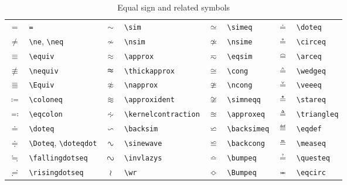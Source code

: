 \documentclass[captions=tableheading]{scrartcl}
\begin{document}
\begin{table}
  \caption{Equal sign and related symbols}
  \label{tab:equal-and-related}
  \centering
  \begin{tabular}[c]{cl@{\hskip 1em}cl@{\hskip 1em}cl@{\hskip 1em}cl}
    \toprule
    $=$ & \verb|=| &
    $\sim$ & \verb|\sim| &
    $\simeq$ & \verb|\simeq| &
    $\doteq$ & \verb|\doteq| \\
    $\ne$ & \verb|\ne|, \verb|\neq| &
    $\nsim$ & \verb|\nsim| &
    $\nsime$ & \verb|\nsime| &
    $\circeq$ & \verb|\circeq| \\
    $\equiv$ & \verb|\equiv| &
    $\approx$ & \verb|\approx| &
    $\eqsim$ & \verb|\eqsim| &
    $\arceq$ & \verb|\arceq| \\
    $\nequiv$ & \verb|\nequiv| &
    $\thickapprox$ & \verb|\thickapprox| &
    $\cong$ & \verb|\cong| &
    $\wedgeq$ & \verb|\wedgeq| \\
    \addlinespace
    $\Equiv$ & \verb|\Equiv| &
    $\napprox$ & \verb|\napprox| &
    $\ncong$ & \verb|\ncong| &
    $\veeeq$ & \verb|\veeeq| \\
    $\coloneq$ & \verb|\coloneq| &
    $\approxident$ & \verb|\approxident| &
    $\simneqq$ & \verb|\simneqq| &
    $\stareq$ & \verb|\stareq| \\
    $\eqcolon$ & \verb|\eqcolon| &
    $\kernelcontraction$ & \verb|\kernelcontraction| &
    $\approxeq$ & \verb|\approxeq| &
    $\triangleq$ & \verb|\triangleq| \\
    $\doteq$ & \verb|\doteq| &
    $\backsim$ & \verb|\backsim| &
    $\backsimeq$ & \verb|\backsimeq| &
    $\eqdef$ & \verb|\eqdef| \\
    \addlinespace
    $\Doteq$ & \verb|\Doteq|, \verb|\doteqdot| &
    $\sinewave$ & \verb|\sinewave| &
    $\backcong$ & \verb|\backcong| &
    $\measeq$ & \verb|\measeq| \\
    $\fallingdotseq$ & \verb|\fallingdotseq| &
    $\invlazys$ & \verb|\invlazys| &
    $\bumpeq$ & \verb|\bumpeq| &
    $\questeq$ & \verb|\questeq| \\
    $\risingdotseq$ & \verb|\risingdotseq| &
    $\wr$ & \verb|\wr| &
    $\Bumpeq$ & \verb|\Bumpeq| &
    $\eqcirc$ & \verb|\eqcirc| \\
    \bottomrule
  \end{tabular}
\end{table}
\end{document}
